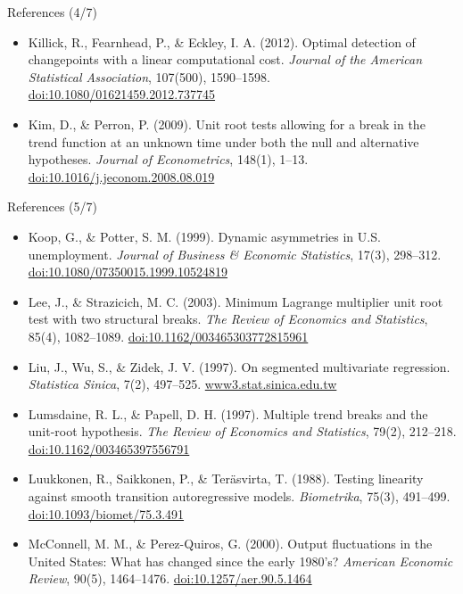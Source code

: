 \begin{frame}{References (4/7)}
\begin{itemize}
    \item Killick, R., Fearnhead, P., \& Eckley, I. A. (2012). Optimal detection of changepoints with a linear computational cost. \textit{Journal of the American Statistical Association}, 107(500), 1590--1598. \href{https://doi.org/10.1080/01621459.2012.737745}{doi:10.1080/01621459.2012.737745}
    \item Kim, D., \& Perron, P. (2009). Unit root tests allowing for a break in the trend function at an unknown time under both the null and alternative hypotheses. \textit{Journal of Econometrics}, 148(1), 1--13. \href{https://doi.org/10.1016/j.jeconom.2008.08.019}{doi:10.1016/j.jeconom.2008.08.019}
\end{itemize}
\end{frame}

\begin{frame}{References (5/7)}
\itemsize{\tiny}
\begin{itemize}
    \item Koop, G., \& Potter, S. M. (1999). Dynamic asymmetries in U.S. unemployment. \textit{Journal of Business \& Economic Statistics}, 17(3), 298--312. \href{https://doi.org/10.1080/07350015.1999.10524819}{doi:10.1080/07350015.1999.10524819}
    \item Lee, J., \& Strazicich, M. C. (2003). Minimum Lagrange multiplier unit root test with two structural breaks. \textit{The Review of Economics and Statistics}, 85(4), 1082--1089. \href{https://doi.org/10.1162/003465303772815961}{doi:10.1162/003465303772815961}
    \item Liu, J., Wu, S., \& Zidek, J. V. (1997). On segmented multivariate regression. \textit{Statistica Sinica}, 7(2), 497--525. \href{https://www3.stat.sinica.edu.tw/statistica/j7n2/j7n213/j7n213.htm}{www3.stat.sinica.edu.tw}
    \item Lumsdaine, R. L., \& Papell, D. H. (1997). Multiple trend breaks and the unit-root hypothesis. \textit{The Review of Economics and Statistics}, 79(2), 212--218. \href{https://doi.org/10.1162/003465397556791}{doi:10.1162/003465397556791}
    \item Luukkonen, R., Saikkonen, P., \& Teräsvirta, T. (1988). Testing linearity against smooth transition autoregressive models. \textit{Biometrika}, 75(3), 491--499. \href{https://doi.org/10.1093/biomet/75.3.491}{doi:10.1093/biomet/75.3.491}
    \item McConnell, M. M., \& Perez-Quiros, G. (2000). Output fluctuations in the United States: What has changed since the early 1980's? \textit{American Economic Review}, 90(5), 1464--1476. \href{https://doi.org/10.1257/aer.90.5.1464}{doi:10.1257/aer.90.5.1464}

\end{itemize}
\end{frame}
